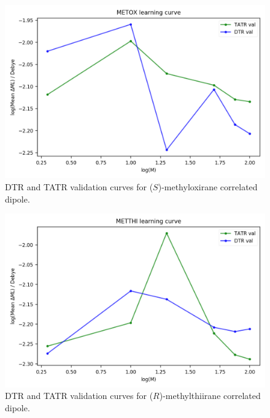 \begin{figure}
    \centering
    \includegraphics[scale=1.0]{p2/figures/si/METOX_learn_log_d.png}
    \caption{DTR and TATR validation curves for ($\textit{S}$)-methyloxirane correlated dipole.}
\end{figure}

\begin{figure}
    \centering
    \includegraphics[scale=1.0]{p2/figures/si/METTHI_learn_log_d.png}
    \caption{DTR and TATR validation curves for ($\textit{R}$)-methylthiirane correlated dipole.}
\end{figure}
